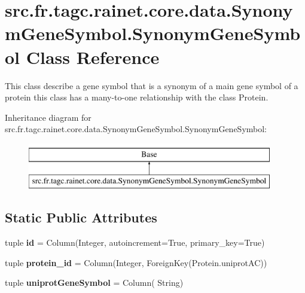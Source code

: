 \hypertarget{classsrc_1_1fr_1_1tagc_1_1rainet_1_1core_1_1data_1_1SynonymGeneSymbol_1_1SynonymGeneSymbol}{}\section{src.\+fr.\+tagc.\+rainet.\+core.\+data.\+Synonym\+Gene\+Symbol.\+Synonym\+Gene\+Symbol Class Reference}
\label{classsrc_1_1fr_1_1tagc_1_1rainet_1_1core_1_1data_1_1SynonymGeneSymbol_1_1SynonymGeneSymbol}


This class describe a gene symbol that is a synonym of a main gene symbol of a protein this class has a many-\/to-\/one relationship with the class Protein.  


Inheritance diagram for src.\+fr.\+tagc.\+rainet.\+core.\+data.\+Synonym\+Gene\+Symbol.\+Synonym\+Gene\+Symbol\+:\begin{figure}[H]
\begin{center}
\leavevmode
\includegraphics[height=2.000000cm]{classsrc_1_1fr_1_1tagc_1_1rainet_1_1core_1_1data_1_1SynonymGeneSymbol_1_1SynonymGeneSymbol}
\end{center}
\end{figure}
\subsection*{Static Public Attributes}
\begin{DoxyCompactItemize}
\item 
\hypertarget{classsrc_1_1fr_1_1tagc_1_1rainet_1_1core_1_1data_1_1SynonymGeneSymbol_1_1SynonymGeneSymbol_a64069383ae398b9a29700ebfa0716d13}{}tuple {\bfseries id} = Column(Integer, autoincrement=True, primary\+\_\+key=True)\label{classsrc_1_1fr_1_1tagc_1_1rainet_1_1core_1_1data_1_1SynonymGeneSymbol_1_1SynonymGeneSymbol_a64069383ae398b9a29700ebfa0716d13}

\item 
\hypertarget{classsrc_1_1fr_1_1tagc_1_1rainet_1_1core_1_1data_1_1SynonymGeneSymbol_1_1SynonymGeneSymbol_a60b0caa4ff16ab1c362f6dffdfdf2f14}{}tuple {\bfseries protein\+\_\+id} = Column(Integer, Foreign\+Key(\textquotesingle{}Protein.\+uniprot\+A\+C\textquotesingle{}))\label{classsrc_1_1fr_1_1tagc_1_1rainet_1_1core_1_1data_1_1SynonymGeneSymbol_1_1SynonymGeneSymbol_a60b0caa4ff16ab1c362f6dffdfdf2f14}

\item 
\hypertarget{classsrc_1_1fr_1_1tagc_1_1rainet_1_1core_1_1data_1_1SynonymGeneSymbol_1_1SynonymGeneSymbol_a8e3ff826f0c90631c48a98fbec986121}{}tuple {\bfseries uniprot\+Gene\+Symbol} = Column( String)\label{classsrc_1_1fr_1_1tagc_1_1rainet_1_1core_1_1data_1_1SynonymGeneSymbol_1_1SynonymGeneSymbol_a8e3ff826f0c90631c48a98fbec986121}

\end{DoxyCompactItemize}


